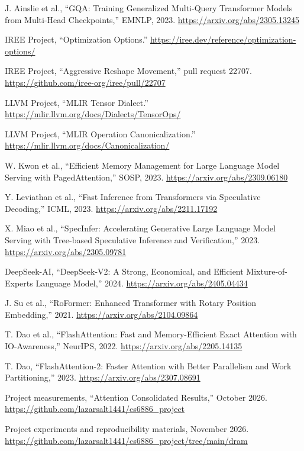 \documentclass[10pt,a4paper]{article}
\begin{document}
\begingroup
\normalsize
\setlength{\parindent}{0pt}
\setlength{\parskip}{6pt}
\noindent[1] J. Ainslie et al., ``GQA: Training Generalized Multi-Query Transformer Models from Multi-Head Checkpoints,'' EMNLP, 2023. \url{https://arxiv.org/abs/2305.13245}\par
\noindent[2] IREE Project, ``Optimization Options.'' \url{https://iree.dev/reference/optimization-options/}\par
\noindent[3] IREE Project, ``Aggressive Reshape Movement,'' pull request 22707. \url{https://github.com/iree-org/iree/pull/22707}\par
\noindent[4] LLVM Project, ``MLIR Tensor Dialect.'' \url{https://mlir.llvm.org/docs/Dialects/TensorOps/}\par
\noindent[5] LLVM Project, ``MLIR Operation Canonicalization.'' \url{https://mlir.llvm.org/docs/Canonicalization/}\par
\noindent[6] W. Kwon et al., ``Efficient Memory Management for Large Language Model Serving with PagedAttention,'' SOSP, 2023. \url{https://arxiv.org/abs/2309.06180}\par
\noindent[7] Y. Leviathan et al., ``Fast Inference from Transformers via Speculative Decoding,'' ICML, 2023. \url{https://arxiv.org/abs/2211.17192}\par
\noindent[8] X. Miao et al., ``SpecInfer: Accelerating Generative Large Language Model Serving with Tree-based Speculative Inference and Verification,'' 2023. \url{https://arxiv.org/abs/2305.09781}\par
\noindent[9] DeepSeek-AI, ``DeepSeek-V2: A Strong, Economical, and Efficient Mixture-of-Experts Language Model,'' 2024. \url{https://arxiv.org/abs/2405.04434}\par
\noindent[10] J. Su et al., ``RoFormer: Enhanced Transformer with Rotary Position Embedding,'' 2021. \url{https://arxiv.org/abs/2104.09864}\par
\noindent[11] T. Dao et al., ``FlashAttention: Fast and Memory-Efficient Exact Attention with IO-Awareness,'' NeurIPS, 2022. \url{https://arxiv.org/abs/2205.14135}\par
\noindent[12] T. Dao, ``FlashAttention-2: Faster Attention with Better Parallelism and Work Partitioning,'' 2023. \url{https://arxiv.org/abs/2307.08691}\par
\noindent[13] Project measurements, ``Attention Consolidated Results,'' October 2026. \url{https://github.com/lazarsalt1441/cs6886_project}\par
\noindent[14] Project experiments and reproducibility materials, November 2026. \url{https://github.com/lazarsalt1441/cs6886_project/tree/main/dram}\par
\endgroup
\end{document}
